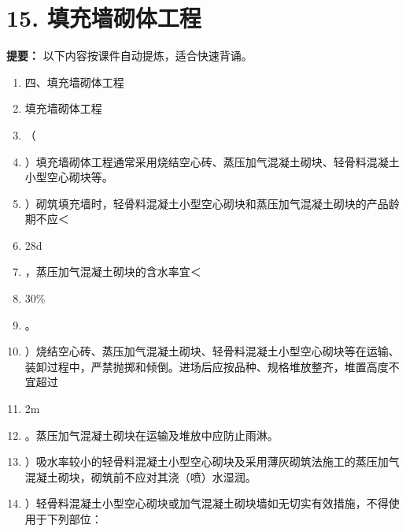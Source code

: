 \documentclass[UTF8,fontset=fandol,11pt]{ctexart}
\begin{document}
\newpage

\section*{15. 填充墙砌体工程}


\begin{mainbox}

\textbf{提要：} 以下内容按课件自动提炼，适合快速背诵。

\end{mainbox}

\begin{enumerate}[label=\arabic*.]

\item 四、填充墙砌体工程

\item 填充墙砌体工程

\item （

\item ）填充墙砌体工程通常采用烧结空心砖、蒸压加气混凝土砌块、轻骨料混凝土小型空心砌块等。

\item ）砌筑填充墙时，轻骨料混凝土小型空心砌块和蒸压加气混凝土砌块的产品龄期不应＜

\item 28d

\item ，蒸压加气混凝土砌块的含水率宜＜

\item 30\%

\item 。

\item ）烧结空心砖、蒸压加气混凝土砌块、轻骨料混凝土小型空心砌块等在运输、装卸过程中，严禁抛掷和倾倒。进场后应按品种、规格堆放整齐，堆置高度不宜超过

\item 2m

\item 。蒸压加气混凝土砌块在运输及堆放中应防止雨淋。

\item ）吸水率较小的轻骨料混凝土小型空心砌块及采用薄灰砌筑法施工的蒸压加气混凝土砌块，砌筑前不应对其浇（喷）水湿润。

\item ）轻骨料混凝土小型空心砌块或加气混凝土砌块墙如无切实有效措施，不得使用于下列部位：


\end{enumerate}
\end{document}
